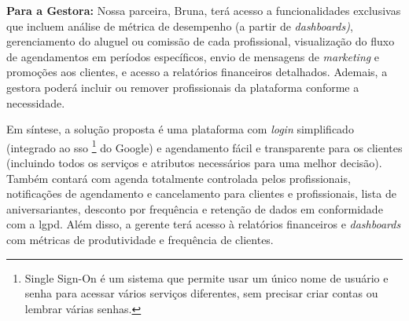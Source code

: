 \noindent\textbf{Para a Gestora:} Nossa parceira, Bruna, terá acesso a funcionalidades exclusivas que incluem análise de métrica de desempenho (a partir de \emph{dashboards)}, gerenciamento do aluguel ou comissão de cada profissional, visualização do fluxo de agendamentos em períodos específicos, envio de mensagens de \emph{marketing} e promoções aos clientes, e acesso a relatórios financeiros detalhados. Ademais, a gestora poderá incluir ou remover profissionais da plataforma conforme a necessidade.

Em síntese, a solução proposta é uma plataforma com \emph{login} simplificado (integrado ao \gls{sso} \footnote{Single Sign-On é um sistema que permite usar um único nome de usuário e senha para acessar vários serviços diferentes, sem precisar criar contas ou lembrar várias senhas.} do Google) e agendamento fácil e transparente para os clientes (incluindo todos os serviços e atributos necessários para uma melhor decisão). Também contará com agenda totalmente controlada pelos profissionais, notificações de agendamento e cancelamento para clientes e profissionais, lista de aniversariantes, desconto por frequência e retenção de dados em conformidade com a \gls{lgpd}. Além disso, a gerente terá acesso à relatórios financeiros e \emph{dashboards} com métricas de produtividade e frequência de clientes.
